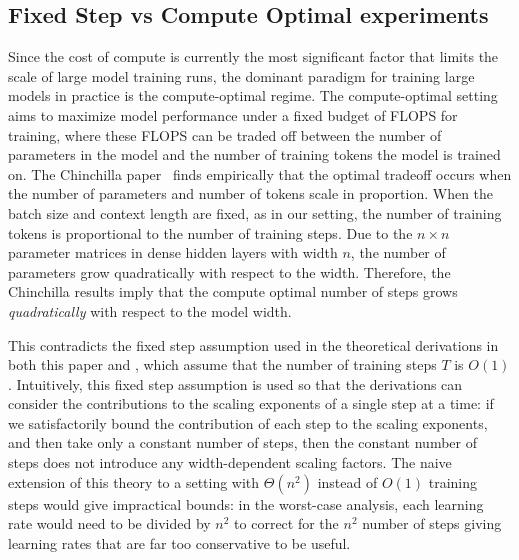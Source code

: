 \documentclass{article}
\theoremstyle{plain}
\theoremstyle{definition}
\theoremstyle{remark}
\begin{document}
\clearpage

\subsection{Fixed Step vs Compute Optimal experiments}
\label{app:fixed_vs_compute_opt}
Since the cost of compute is currently the most significant factor that limits the scale of large model training runs, the dominant paradigm for training large models in practice is the compute-optimal regime. The compute-optimal setting~\citep{kaplan2019notes} aims to maximize model performance under a fixed budget of FLOPS for training, where these FLOPS can be traded off between the number of parameters in the model and the number of training tokens the model is trained on. The Chinchilla paper~\citep{hoffmann2022training} finds empirically that the optimal tradeoff occurs when the number of parameters and number of tokens scale in proportion. When the batch size and context length are fixed, as in our setting, the number of training tokens is proportional to the number of training steps. Due to the $n \times n$ parameter matrices in dense hidden layers with width $n$, the number of parameters grow quadratically with respect to the width. Therefore, the Chinchilla results imply that the compute optimal number of steps grows \emph{quadratically} with respect to the model width.

This contradicts the fixed step assumption used in the theoretical derivations in both this paper and \citet{yang2021tensoriv,yang2023tensorivb}, which assume that the number of training steps $T$ is $O(1)$. Intuitively, this fixed step assumption is used so that the derivations can consider the contributions to the scaling exponents of a single step at a time: if we satisfactorily bound the contribution of each step to the scaling exponents, and then take only a constant number of steps, then the constant number of steps does not introduce any width-dependent scaling factors. The naive extension of this theory to a setting with $\Theta(n^2)$ instead of $O(1)$ training steps would give impractical bounds: in the worst-case analysis, each learning rate would need to be divided by $n^2$ to correct for the $n^2$ number of steps giving learning rates that are far too conservative to be useful.
\end{document}
